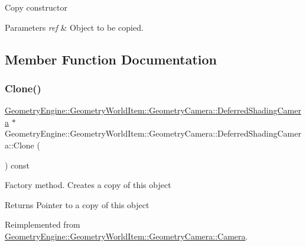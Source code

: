 Copy constructor 
\begin{DoxyParams}{Parameters}
{\em ref} & Object to be copied. \\
\hline
\end{DoxyParams}


\subsection{Member Function Documentation}
\mbox{\label{class_geometry_engine_1_1_geometry_world_item_1_1_geometry_camera_1_1_deferred_shading_camera_ac020fe14bc32f3fdbd0c9423af1c975f}} 
\subsubsection{\texorpdfstring{Clone()}{Clone()}}
{\footnotesize\ttfamily \mbox{\hyperlink{class_geometry_engine_1_1_geometry_world_item_1_1_geometry_camera_1_1_deferred_shading_camera}{Geometry\+Engine\+::\+Geometry\+World\+Item\+::\+Geometry\+Camera\+::\+Deferred\+Shading\+Camera}} $\ast$ Geometry\+Engine\+::\+Geometry\+World\+Item\+::\+Geometry\+Camera\+::\+Deferred\+Shading\+Camera\+::\+Clone (\begin{DoxyParamCaption}{ }\end{DoxyParamCaption}) const\hspace{0.3cm}{\ttfamily [virtual]}}

Factory method. Creates a copy of this object \begin{DoxyReturn}{Returns}
Pointer to a copy of this object 
\end{DoxyReturn}


Reimplemented from \mbox{\hyperlink{class_geometry_engine_1_1_geometry_world_item_1_1_geometry_camera_1_1_camera_a53b37943c1929fde7396c66a36fb3c52}{Geometry\+Engine\+::\+Geometry\+World\+Item\+::\+Geometry\+Camera\+::\+Camera}}.

\mbox{\label{class_geometry_engine_1_1_geometry_world_item_1_1_geometry_camera_1_1_deferred_shading_camera_a00eba99af30625646ea11f442ffa2742}} 
